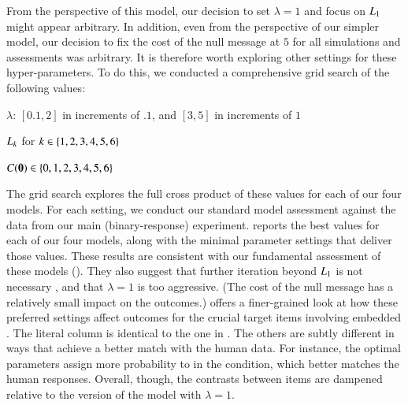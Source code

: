 \documentclass[leqno,12pt]{article}
\begin{document}
\begin{appendix}
From the perspective of this model, our decision to set $\lambda=1$
and focus on $\UncertaintyListener[1]$ might appear arbitrary.  In
addition, even from the perspective of our simpler model, our decision
to fix the cost of the null message at $5$ for all simulations and
assessments was arbitrary. It is therefore worth exploring other
settings for these hyper-parameters. To do this, we conducted a
comprehensive grid search of the following values:
%
\begin{examples}
\item
  \begin{examples}
  \item $\lambda$: $[0.1, 2]$ in increments of $.1$, and $[3,5]$ in increments of $1$
  \item $\UncertaintyListener[k]$ for $k \in \set{1,2,3,4,5,6}$
  \item $\Costs(\nullmsg) \in \set{0, 1, 2, 3, 4, 5, 6}$
  \end{examples}
\end{examples}
%
The grid search explores the full cross product of these values for
each of our four models. For each setting, we conduct our standard
model assessment against the data from our main (binary-response)
experiment.  reports the best values for each of our
four models, along with the minimal parameter settings that deliver
those values. These results are consistent with our fundamental
assessment of these models (). They also
suggest that further iteration beyond $\UncertaintyListener[1]$ is not
necessary \citep{Vogel-etal:2014}, and that $\lambda=1$ is too
aggressive. (The cost of the null message has a relatively small
impact on the outcomes.)  offers a finer-grained
look at how these preferred settings affect outcomes for the crucial
target items involving embedded . The literal column is
identical to the one in . The others are
subtly different in ways that achieve a better match with the human
data. For instance, the optimal parameters assign more probability to
 in the  condition, which better matches
the human responses. Overall, though, the contrasts between items are
dampened relative to the version of the model with $\lambda=1$.




\end{appendix}
\end{document}
